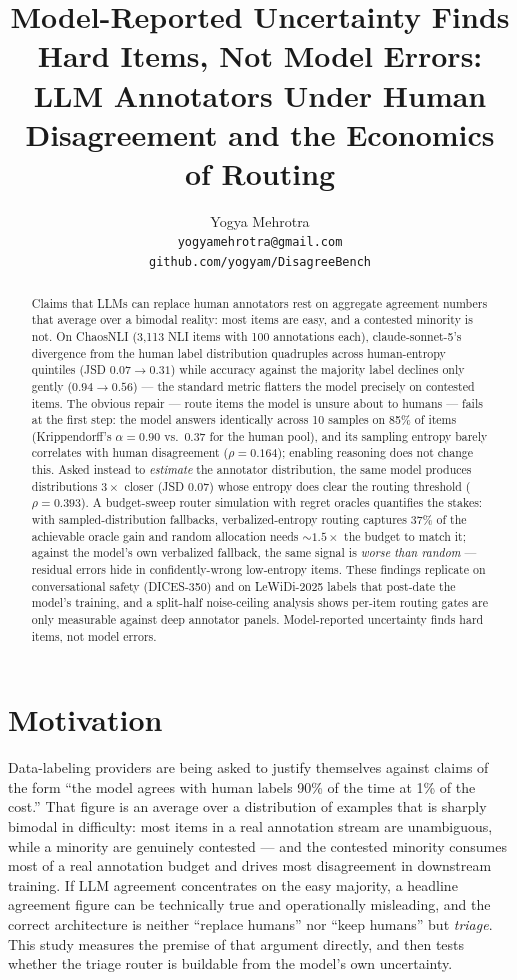 \documentclass[11pt]{article}
\title{Model-Reported Uncertainty Finds Hard Items, Not Model Errors:\\ LLM Annotators Under Human Disagreement and the Economics of Routing}
\author{Yogya Mehrotra \\
  \texttt{yogyamehrotra@gmail.com} \\
  \texttt{github.com/yogyam/DisagreeBench}}
\begin{document}
\maketitle

\begin{abstract}
Claims that LLMs can replace human annotators rest on aggregate agreement numbers that average over a bimodal reality: most items are easy, and a contested minority is not. On ChaosNLI (3,113 NLI items with 100 annotations each), claude-sonnet-5's divergence from the human label distribution quadruples across human-entropy quintiles (JSD $0.07 \rightarrow 0.31$) while accuracy against the majority label declines only gently ($0.94 \rightarrow 0.56$) --- the standard metric flatters the model precisely on contested items. The obvious repair --- route items the model is unsure about to humans --- fails at the first step: the model answers identically across 10 samples on 85\% of items (Krippendorff's $\alpha = 0.90$ vs.\ 0.37 for the human pool), and its sampling entropy barely correlates with human disagreement ($\rho = 0.164$); enabling reasoning does not change this. Asked instead to \emph{estimate} the annotator distribution, the same model produces distributions $3\times$ closer (JSD 0.07) whose entropy does clear the routing threshold ($\rho = 0.393$). A budget-sweep router simulation with regret oracles quantifies the stakes: with sampled-distribution fallbacks, verbalized-entropy routing captures 37\% of the achievable oracle gain and random allocation needs ${\sim}1.5\times$ the budget to match it; against the model's own verbalized fallback, the same signal is \emph{worse than random} --- residual errors hide in confidently-wrong low-entropy items. These findings replicate on conversational safety (DICES-350) and on LeWiDi-2025 labels that post-date the model's training, and a split-half noise-ceiling analysis shows per-item routing gates are only measurable against deep annotator panels. Model-reported uncertainty finds hard items, not model errors.
\end{abstract}

\section{Motivation}
\label{sec:motivation}

Data-labeling providers are being asked to justify themselves against claims of the form ``the model agrees with human labels 90\% of the time at 1\% of the cost.'' That figure is an average over a distribution of examples that is sharply bimodal in difficulty: most items in a real annotation stream are unambiguous, while a minority are genuinely contested --- and the contested minority consumes most of a real annotation budget and drives most disagreement in downstream training. If LLM agreement concentrates on the easy majority, a headline agreement figure can be technically true and operationally misleading, and the correct architecture is neither ``replace humans'' nor ``keep humans'' but \emph{triage}. This study measures the premise of that argument directly, and then tests whether the triage router is buildable from the model's own uncertainty.
\end{document}
